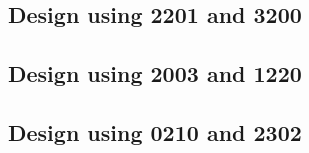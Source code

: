 \subsection{Design using 2201 and 3200}


 \begin{center}




 \end{center}



\subsection{Design using 2003 and 1220}


 \begin{center}




 \end{center}



\subsection{Design using 0210 and 2302}


 \begin{center}




 \end{center}



